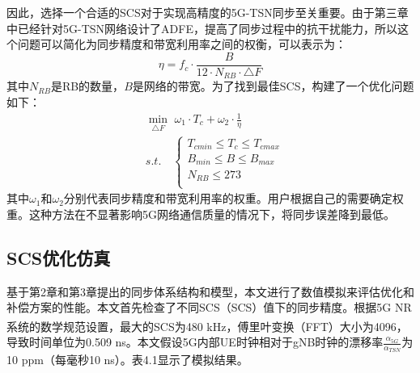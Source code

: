 \documentclass[UTF8,a4paper,12pt]{ctexart}
\numberwithin{equation}{section}
\begin{document}
	因此，选择一个合适的SCS对于实现高精度的5G-TSN同步至关重要。由于第三章中已经针对5G-TSN网络设计了ADFE，提高了同步过程中的抗干扰能力，所以这个问题可以简化为同步精度和带宽利用率之间的权衡，可以表示为：
	\begin{equation}
		\eta=f_c\cdot \frac{B}{12\cdot N_{RB}\cdot \triangle F}
	\end{equation}
	其中$N_{RB}$是RB的数量，$B$是网络的带宽。为了找到最佳SCS，构建了一个优化问题如下：
	\begin{equation}
		\begin{split}
			&\min_{\triangle F} \,\, \omega_1 \cdot T_c+\omega_2 \cdot \frac{1}{\eta} \\
			&s.t.\quad  \left\{\begin{array}{lc}
				T_{cmin}\leq T_c \leq T_{cmax}\\
				B_{min}\leq B \leq B_{max}\\
				N_{RB}\leq 273\\
			\end{array}\right.
		\end{split}
	\end{equation}
	其中$\omega_1$和$\omega_2$分别代表同步精度和带宽利用率的权重。用户根据自己的需要确定权重。这种方法在不显著影响5G网络通信质量的情况下，将同步误差降到最低。
	\begin{figure}[htb] 
	\end{figure}
	
	\subsection{SCS优化仿真}
	基于第2章和第3章提出的同步体系结构和模型，本文进行了数值模拟来评估优化和补偿方案的性能。本文首先检查了不同SCS（SCS）值下的同步精度。根据5G NR系统的数学规范设置\textsuperscript{\cite{access2015requirements}}，最大的SCS为480 kHz，傅里叶变换（FFT）大小为4096，导致时间单位为0.509 ns。本文假设5G内部UE时钟相对于gNB时钟的漂移率$\frac{\alpha_{5G}}{\alpha_{TSN}}$为10 ppm（每毫秒10 ns）。表4.1显示了模拟结果。
	
\end{document}
